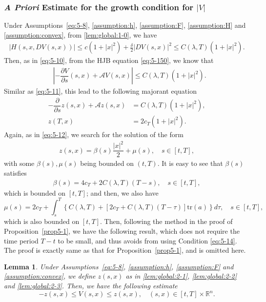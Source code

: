 \documentclass[11pt]{article}
\numberwithin{equation}{section}
\newtheorem{lemma}[theorem]{Lemma}
\newcommand{\brn}{{\mathbb{R}^n}}
\newcommand{\1}{\mbox{1\hspace{-1mm}I}}
\begin{document}
\subsubsection{\textit{A Priori} Estimate for the growth condition for $|V|$}\label{subsubsec:global:|V|}

Under Assumptions~\ref{eq:5-8}, \ref{assumption:h}, \ref{assumption:F}, \ref{assumption:H} and \ref{assumption:convex}, from \eqref{lem:global:1-0}, we have
\begin{align*}
    |H(s,x,DV(s,x))|\le c(1+|x|^2)+\frac{\delta}{2} |DV(s,x)|^2 \le C(\lambda,T)(1+|x|^2).
\end{align*}
Then, as in \eqref{eq:5-10}, from the HJB equation \eqref{eq:5-150}, we know that
\begin{align*}
    &\left|-\dfrac{\partial V}{\partial s}(s,x)+\mathcal{A}V(s,x)\right| \le C(\lambda,T)(1+|x|^{2}).
\end{align*}
Similar as \eqref{eq:5-11}, this lead to the following majorant equation 
\begin{align*}
    -\dfrac{\partial}{\partial s}z(s,x)+\mathcal{A}z(s,x)&= C(\lambda,T)\left(1+|x|^{2}\right),\\
    z(T,x)&=2c_{T}(1+|x|^{2}).
\end{align*}
Again, as in \eqref{eq:5-12}, we search for the solution of the form 
\begin{align}\label{lem:global:2-1}
    z(s,x)=\beta(s)\dfrac{|x|^{2}}{2}+\mu(s),\quad s\in[t,T], 
\end{align}
with some $\beta(s),\mu(s)$ being bounded on $(t,T)$. It is easy to see that $\beta(s)$ satisfies
\begin{align}\label{lem:global:2-2}
    \beta(s)=4c_T + 2C(\lambda,T)(T-s),\quad s\in[t,T], 
\end{align}
which is bounded on $[t,T]$; and then, we also have
\begin{equation}\label{lem:global:2-3}
    \mu(s)=2c_{T}+\int_{s}^{T}\left\{C(\lambda,T)+[2c_T + C(\lambda,T)(T-\tau)]\text{tr}(a)\right\}d\tau,\quad s\in[t,T], 
\end{equation}
which is also bounded on $[t,T]$. Then, following the method in the proof of Proposition~\ref{prop5-1}, we have the following result, which does not require the time period $T-t$ to be small, and thus avoids from using Condition \eqref{eq:5-14}. The proof is exactly same as that for  Proposition~\ref{prop5-1}, and is omitted here.

\begin{lemma}\label{lem:global:2}
Under Assumptions~\ref{eq:5-8}, \ref{assumption:h}, \ref{assumption:F} and \ref{assumption:convex}, we define $z(s,x)$ as in \eqref{lem:global:2-1}, \eqref{lem:global:2-2} and \eqref{lem:global:2-3}. Then, we have the following estimate 
\begin{equation*}\label{lem:global:2-0}
    -z(s,x)\le V(s,x)\leq z(s,x),\quad (s,x)\in[t,T]\times\brn.
\end{equation*}
\end{lemma}
\end{document}

